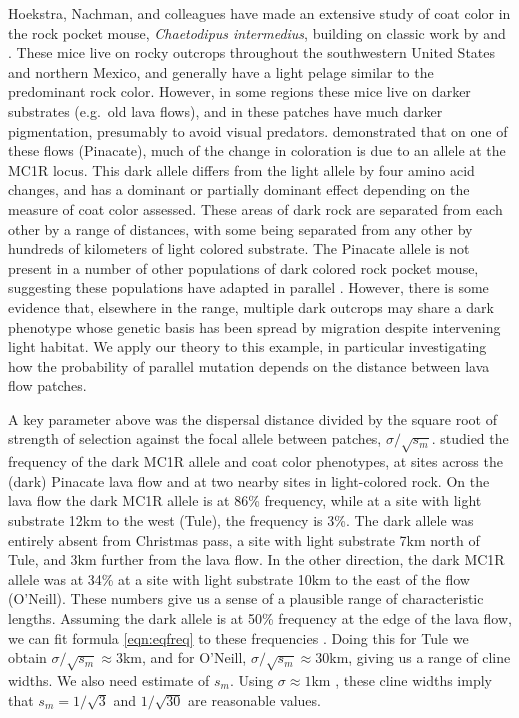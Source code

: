 \documentclass{article}
\begin{document}
Hoekstra, Nachman, and colleagues have made an extensive study of coat color in the rock pocket mouse, 
\emph{Chaetodipus intermedius}, building on classic work by \citet{benson1933concealing} and \citet{dice1940ecologic}.
These mice live on rocky outcrops throughout the southwestern United States and northern Mexico, 
and generally have a light pelage similar to the predominant rock color.
However, in some regions these mice live on darker substrates (e.g.\ old lava flows),
and in these patches have much darker pigmentation, 
presumably to avoid visual predators.
\citet{nachman2003genetic} demonstrated that on one of these flows (Pinacate), 
much of the change in coloration is due to an allele at the MC1R locus.
This dark allele differs from the light allele by four amino acid changes, 
and has a dominant or partially dominant effect depending on the measure of coat color assessed. 
These areas of dark rock are separated from each other by a range of distances, 
with some being separated from any other by hundreds of kilometers of light colored substrate. 
The Pinacate allele is not present in a number of other populations of dark colored rock pocket mouse, 
suggesting these populations have adapted in parallel \citep{hoekstra2003different}.
However, there is some evidence \citep{Hoekstra:05} that, elsewhere in the range, 
multiple dark outcrops may share a dark phenotype whose genetic basis has been spread by migration
despite intervening light habitat. 
We apply our theory to this example,
in particular investigating how the probability of parallel mutation depends on 
the distance between lava flow patches.

A key parameter above was the dispersal distance divided by the square root of strength of selection against the focal allele between patches, $\sigma/\sqrt{s_m}$. 
\citet{hoekstra2004ecological} studied the frequency of the dark MC1R allele and coat color phenotypes, 
at sites across the (dark) Pinacate lava flow and at two nearby sites in light-colored rock.
On the lava flow the dark MC1R allele is at 86\% frequency,
while at a site with light substrate 12km to the west (Tule), the frequency is 3\%.
The dark allele was entirely absent from Christmas pass, a site with light substrate 7km north of Tule, and 3km further from the lava flow.
In the other direction, the dark MC1R allele was at 34\% at a site with light substrate 10km to the east of the flow (O'Neill).
These numbers give us a sense of a plausible range of characteristic lengths.
Assuming the dark allele is at 50\% frequency at the edge of the lava flow, 
we can fit formula \eqref{eqn:eqfreq} to these frequencies
\citep[similar to][]{hoekstra2004ecological}.
Doing this for Tule we obtain $\sigma/\sqrt{s_m} \approx 3$km, 
and for O'Neill, $\sigma/\sqrt{s_m} \approx 30$km, giving us a range of cline widths. 
We also need estimate of $s_m$. 
Using $\sigma \approx 1$km \citep{french1968dispersal,allred1963range}, 
these cline widths imply that $s_m=1/\sqrt{3}$ and $1/\sqrt{30}$ are reasonable values.
\end{document}

